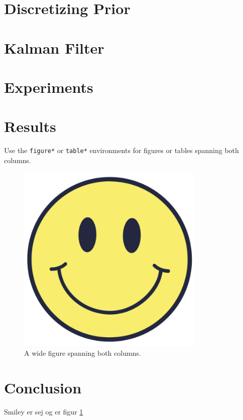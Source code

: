 \section{Discretizing Prior}\label{sec:matrix_exponential}


\section{Kalman Filter}\label{sec:kalman_filter}


\section{Experiments}


\section{Results}
Use the \texttt{figure*} or \texttt{table*} environments for figures or tables spanning both columns.

\begin{figure}[ht]
    \centering
    \includegraphics[width=0.8\textwidth]{../images/smiley.png}
    \caption{A wide figure spanning both columns.}
    \label{smileybotch}
\end{figure}

\section{Conclusion}
Smiley er sej og er figur \ref{smileybotch}

\cite{example2024}
\printbibliography


